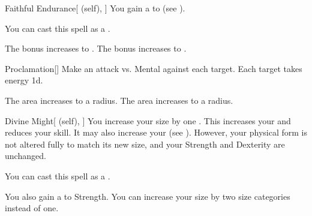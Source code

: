 \lowercase{\hypertarget{spell:Faithful Endurance}{}}\label{spell:Faithful Endurance}
\begin{attuneability}[Rank 3]{\hypertarget{spell:Faithful Endurance}{Faithful Endurance}}[ (self), ]
You gain a   to  (see ).

You can cast this spell as a .

\rankline
{} The bonus increases to .
 The bonus increases to .

\end{attuneability}
\vspace{0.25em}



\lowercase{\hypertarget{spell:Proclamation}{}}\label{spell:Proclamation}
\begin{freeability}[Rank 3]{\hypertarget{spell:Proclamation}{Proclamation}}[]
Make an attack vs. Mental against each target.
\hit Each target takes energy  \minus1d.

\rankline
{} The area increases to a \arealarge radius.
 The area increases to a \areahuge radius.

\end{freeability}
\vspace{0.25em}



\lowercase{\hypertarget{spell:Divine Might}{}}\label{spell:Divine Might}
\begin{attuneability}[Rank 4]{\hypertarget{spell:Divine Might}{Divine Might}}[ (self), ]
You increase your size by one .
This increases your  and reduces your  skill.
It may also increase your  (see ).
However, your physical form is not altered fully to match its new size, and your Strength and Dexterity are unchanged.

You can cast this spell as a .

\rankline
{} You also gain a   to Strength.
 You can increase your size by two size categories instead of one.

\end{attuneability}
\vspace{0.25em}



